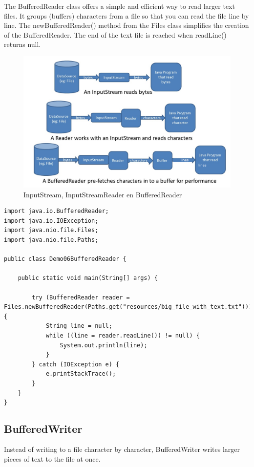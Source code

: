 The BufferedReader class offers a simple and efficient way to read larger text files. It groups (buffers) characters from a file so that you can read the file line by line. The newBufferedReader() method from the Files class simplifies the creation of the BufferedReader. The end of the text file is reached when readLine() returns null.

\begin{figure}[H]
  \includegraphics[width=\linewidth]{images/file_io/stream_reader.png}
  \caption{InputStream, InputStreamReader en BufferedReader}
  \label{fig:paths}
\end{figure}

\begin{lstlisting}
import java.io.BufferedReader;
import java.io.IOException;
import java.nio.file.Files;
import java.nio.file.Paths;

public class Demo06BufferedReader {

	public static void main(String[] args) {

		try (BufferedReader reader =  Files.newBufferedReader(Paths.get("resources/big_file_with_text.txt"))) {
			String line = null;
			while ((line = reader.readLine()) != null) {
				System.out.println(line);
			}
		} catch (IOException e) {
			e.printStackTrace();
		}
	}
}
\end{lstlisting}

\subsection{BufferedWriter}


Instead of writing to a file character by character, BufferedWriter writes larger pieces of text to the file at once.

